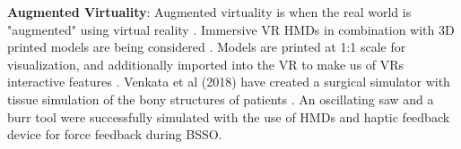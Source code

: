 \textbf{Augmented Virtuality}: Augmented virtuality is when the real world is "augmented" using virtual reality \cite{Milgram.1994}.
Immersive VR HMDs in combination with 3D printed models are being considered \cite{.2017,Sampogna.2017,Barber.2018}.
Models are printed at 1:1 scale for visualization, and additionally imported into the VR to make us of VRs interactive features \cite{.2017}.
\newline
Venkata et al (2018) have created a surgical simulator with tissue simulation of the bony structures of patients \cite{VenkataS.Arikatla.2018}.
An oscillating saw and a burr tool were successfully simulated with the use of HMDs and haptic feedback device for force feedback during BSSO.